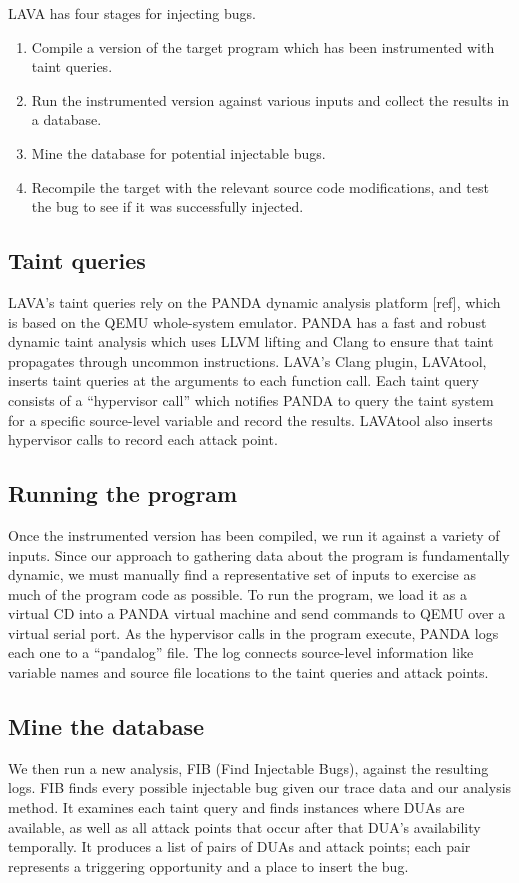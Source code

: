 LAVA has four stages for injecting bugs.
\begin{enumerate}
\item Compile a version of the target program which has been instrumented with taint queries.
\item Run the instrumented version against various inputs and collect the results in a database.
\item Mine the database for potential injectable bugs.
\item Recompile the target with the relevant source code modifications, and test the bug to see if it was successfully injected.
\end{enumerate}

\subsection{Taint queries}
LAVA's taint queries rely on the PANDA dynamic analysis platform [ref], which is based on the QEMU whole-system emulator.
PANDA has a fast and robust dynamic taint analysis which uses LLVM lifting and Clang to ensure that taint propagates through uncommon instructions.
LAVA's Clang plugin, LAVAtool, inserts taint queries at the arguments to each function call.
Each taint query consists of a ``hypervisor call'' which notifies PANDA to query the taint system for a specific source-level variable and record the results.
LAVAtool also inserts hypervisor calls to record each attack point.

\subsection{Running the program}
Once the instrumented version has been compiled, we run it against a variety of inputs.
Since our approach to gathering data about the program is fundamentally dynamic, we must manually find a representative set of inputs to exercise as much of the program code as possible.
To run the program, we load it as a virtual CD into a PANDA virtual machine and send commands to QEMU over a virtual serial port.
As the hypervisor calls in the program execute, PANDA logs each one to a ``pandalog'' file.
The log connects source-level information like variable names and source file locations to the taint queries and attack points.

\subsection{Mine the database}
We then run a new analysis, FIB (Find Injectable Bugs), against the resulting logs.
FIB finds every possible injectable bug given our trace data and our analysis method.
It examines each taint query and finds instances where DUAs are available, as well as all attack points that occur after that DUA's availability temporally.
It produces a list of pairs of DUAs and attack points; each pair represents a triggering opportunity and a place to insert the bug.

